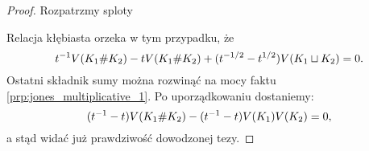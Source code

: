 \begin{proof}
    Rozpatrzmy sploty
\begin{comment}
    \begin{figure}[H]
    \centering
        \begin{minipage}[b]{.3\linewidth}
            \[
                \MediumJonesShrapA
            \]
        \end{minipage}
        \begin{minipage}[b]{.3\linewidth}
            \[
                \MediumJonesShrapB
            \]
        \end{minipage}
        \begin{minipage}[b]{.3\linewidth}
            \[
                \MediumJonesShrapAB
            \]
        \end{minipage}
    \end{figure}
\end{comment}
    Relacja kłębiasta orzeka w tym przypadku, że
    \begin{equation}
        t^{-1} V(K_1 \# K_2) - t V(K_1 \# K_2) + (t^{-1/2} - t^{1/2}) V(K_1 \sqcup K_2) = 0.
    \end{equation}
    Ostatni składnik sumy można rozwinąć na mocy faktu \ref{prp:jones_multiplicative_1}.
    Po uporządkowaniu dostaniemy:
    \begin{equation}
        (t^{-1} - t) V(K_1 \# K_2) - (t^{-1} - t) V(K_1) V(K_2) = 0,
    \end{equation}
    a stąd widać już prawdziwość dowodzonej tezy.
\end{proof}

